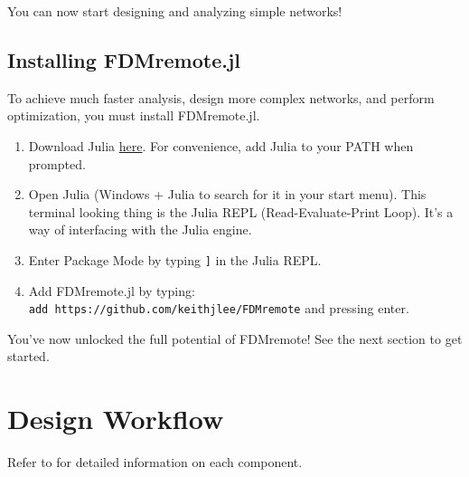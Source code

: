 \documentclass{ol-softwaremanual}
\begin{document}
You can now start designing and analyzing simple networks!

\subsection{Installing FDMremote.jl}
To achieve much faster analysis, design more complex networks, and perform optimization, you must install FDMremote.jl. 

\begin{enumerate}
    \item Download Julia \href{https://julialang.org/downloads/}{here}. For convenience, add Julia to your PATH when prompted.
    \item Open Julia (Windows + Julia to search for it in your start menu). This terminal looking thing is the Julia REPL (Read-Evaluate-Print Loop). It's a way of interfacing with the Julia engine.
    \item Enter Package Mode by typing \texttt{]} in the Julia REPL.
    \item Add FDMremote.jl by typing:\\ \texttt{add https://github.com/keithjlee/FDMremote} and pressing enter.
\end{enumerate}

 You've now unlocked the full potential of FDMremote! See the next section to get started.

\newpage
\section{Design Workflow} \label{sec:workflow}
Refer to  for detailed information on each component. 



\newpage
\end{document}
